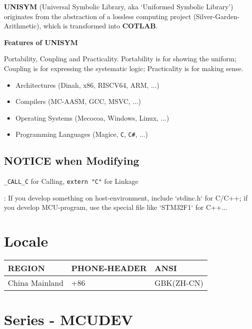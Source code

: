 

\textbf{UNISYM} (Universal Symbolic Library, aka `Uniformed Symbolic Library') originates from the abstraction of a lossless computing project (Silver-Garden-Arithmetic), which is transformed into \textbf{COTLAB}.

\textbf{Features of UNISYM}

Portability, Coupling and Practicality. Portability is for showing the uniform; Coupling is for expressing the systematic logic; Practicality is for making sense.

\begin{itemize}
	\item Architectures (Dinah, x86, RISCV64, ARM, ...)
	\item Compilers (MC-AASM, GCC, MSVC, ...)
	\item Operating Systems (Mecocoa, Windows, Linux, ...)
	\item Programming Languages (Magice, \verb|C|, \verb|C#|, ...)
\end{itemize}

\subsection{NOTICE when Modifying}

\verb`_CALL_C` for Calling, \verb`extern "C"` for Linkage


:
If you develop something on host-environment, include `stdinc.h` for C/C++;
if you develop MCU-program, use the special file like `STM32F1` for C++...


\section{Locale}

\begin{center}\begin{table}[h!]
	\begin{tabular}{|l|l|l|}
	\hline
	\rowcolor[rgb]{0.95, 0.975, 1}\textbf{REGION} & \textbf{PHONE-HEADER} & \textbf{ANSI} \\ \hline
	China Mainland & +86 & GBK(ZH-CN) \\ \hline
	\end{tabular}
\end{table}\end{center}

\section{Series \mbox{-} {MCUDEV}}

